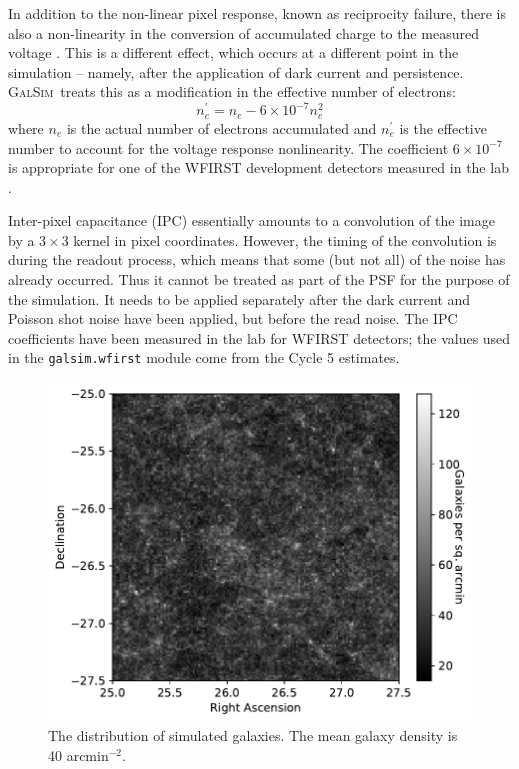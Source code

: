 \documentclass[usenatbib]{mnras}
\newcommand{\galsim}{\textsc{GalSim}}
\begin{document}
In addition to the non-linear pixel response, known as reciprocity failure, there is also a non-linearity in the conversion of accumulated charge to the measured voltage \citep{2017JInst..12C4009P,Biesiadzinski2011,10.1117/12.2314475}.
This is a different effect, which occurs at a different point in the simulation -- namely, after the application of dark current \citep{10.1117/12.790382,10.1117/12.2057308,10.1117/12.2233664} and persistence. 
\galsim\ treats this as a modification in the effective number of electrons:
\begin{equation}
n_e^\prime = n_e - 6 \times 10^{-7} n_e^2
\end{equation}
where $n_e$ is the actual number of electrons accumulated and $n_e^\prime$ is the effective number to account for the voltage response nonlinearity. The coefficient $6\times 10^{-7}$ is appropriate for one of the WFIRST development detectors measured in the lab \citep{2019arXiv190601847C}.

Inter-pixel capacitance (IPC) \citep{2016PASP..128i5001K} essentially amounts to a convolution of the image by a $3 \times 3$ kernel in pixel coordinates.
However, the timing of the convolution is during the readout process, which means that some (but not all) of the noise has already occurred.  
Thus it cannot be treated as part of the PSF for the purpose of the simulation.  
It needs to be applied separately after the dark current and Poisson shot noise have been applied, but before the read noise.  
The IPC coefficients have been measured in the lab for WFIRST detectors; the values used in the \texttt{galsim.wfirst} module come from the Cycle 5 estimates. 

\begin{figure}
\begin{center}
\includegraphics[width=\columnwidth]{figures/galaxies.pdf}
\end{center}
\caption[]{
The distribution of simulated galaxies. The mean galaxy density is 40 arcmin$^{-2}$. 
\label{fig:galaxies}}
\end{figure}
\end{document}
